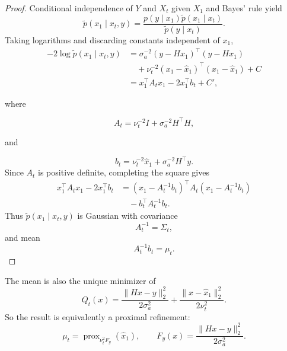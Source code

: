 \documentclass[11pt,a4paper]{article}
\newcommand{\sa}{\sigma_a}
\begin{document}
\begin{proof}
Conditional independence of $Y$ and $X_t$ given $X_1$
and Bayes' rule yield
\begin{equation}
    \widetilde p(x_1\mid x_t,y)
    =
    \frac{
        p(y\mid x_1)
        \widetilde p(x_1\mid x_t)
    }{
        \widetilde p(y\mid x_t)
    }.
\end{equation}
Taking logarithms and discarding constants independent of $x_1$,
\begin{align}
    -2\log\widetilde p(x_1\mid x_t,y)
    &=
    \sa^{-2}
    (y-Hx_1)^\top(y-Hx_1)
    \nonumber\\
    &\quad+
    \nu_t^{-2}
    (x_1-\widehat x_1)^\top
    (x_1-\widehat x_1)
    +C
    \\
    &=
    x_1^\top A_t x_1
    -
    2x_1^\top b_t
    +C',
\end{align}

where

\begin{equation}
    A_t
    =
    \nu_t^{-2}I
    +
    \sa^{-2}H^\top H,
\end{equation}

and

\begin{equation}
    b_t
    =
    \nu_t^{-2}\widehat x_1
    +
    \sa^{-2}H^\top y.
\end{equation}
Since $A_t$ is positive definite, completing the square gives
\begin{align}
    x_1^\top A_t x_1-2x_1^\top b_t
    &=
    (x_1-A_t^{-1}b_t)^\top
    A_t
    (x_1-A_t^{-1}b_t)
    \nonumber\\
    &\quad-
    b_t^\top A_t^{-1}b_t.
\end{align}
Thus $\widetilde p(x_1\mid x_t,y)$ is Gaussian with covariance
\begin{equation}
    A_t^{-1}
    =
    \Sigma_t,
\end{equation}
and mean
\begin{equation}
    A_t^{-1}b_t
    =
    \mu_t.
\end{equation}
\end{proof}
The mean is also the unique minimizer of
\begin{equation}
    Q_t(x)
    =
    \frac{\|Hx-y\|_2^2}{2\sa^2}
    +
    \frac{\|x-\widehat x_1\|_2^2}{2\nu_t^2}.
    \label{eq:objective}
\end{equation}
So the result is equivalently a proximal refinement:
\begin{equation}
    \mu_t
    =
    \operatorname{prox}_{\nu_t^2 F_y}(\widehat x_1),
    \qquad
    F_y(x)
    =
    \frac{\|Hx-y\|_2^2}{2\sa^2}.
    \label{eq:flowerprox}
\end{equation}
\end{document}
